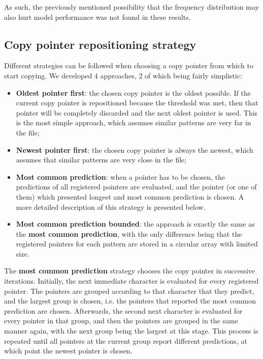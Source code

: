 \documentclass{article}
\begin{document}
As such, the previously mentioned possibility that the frequency distribution may also hurt model performance was not found in these results.

\subsection{Copy pointer repositioning strategy}

Different strategies can be followed when choosing a copy pointer from which to start copying.
We developed 4 approaches, 2 of which being fairly simplistic:
\begin{itemize}
    \item \textbf{Oldest pointer first}: the chosen copy pointer is the oldest possible. If the current copy pointer is repositioned because the threshold was met, then that pointer will be completely discarded and the next oldest pointer is used.
    This is the most simple approach, which assumes similar patterns are very far in the file;
    \item \textbf{Newest pointer first}: the chosen copy pointer is always the newest, which assumes that similar patterns are very close in the file;
    \item \textbf{Most common prediction}: when a pointer has to be chosen, the predictions of all registered pointers are evaluated, and the pointer (or one of them) which presented longest and most common prediction is chosen.
    A more detailed description of this strategy is presented below.
    \item \textbf{Most common prediction bounded}: the approach is exactly the same as the \textbf{most common prediction}, with the only difference being that the registered pointers for each pattern are stored in a circular array with limited size.
\end{itemize}

The \textbf{most common prediction} strategy chooses the copy pointer in successive iterations.
Initially, the next immediate character is evaluated for every registered pointer.
The pointers are grouped according to that character that they predict, and the largest group is chosen, i.e. the pointers that reported the most common prediction are chosen.
Afterwards, the second next character is evaluated for every pointer in that group, and then the pointers are grouped in the same manner again, with the next group being the largest at this stage.
This process is repeated until all pointers at the current group report different predictions, at which point the newest pointer is chosen.
\end{document}
